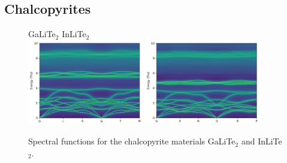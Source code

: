 \newpage

\subsection{Chalcopyrites}
\begin{figure}
	\centering
	GaLiTe$_2$ \hspace{3.7cm} InLiTe$_2$\\
	\includegraphics[width=0.45\textwidth]{./data/plots/spectral_functions/122.04.GaLiTe2.png}
	\includegraphics[width=0.45\textwidth]{./data/plots/spectral_functions/122.04.InLiTe2.png}
	\caption{Spectral functions for the chalcopyrite materials GaLiTe$_2$ and InLiTe$_2$.}
	\label{fig:kappa_sigma}
\end{figure}

\cite{kuhn1985,kuhn1987,isaenko2005}

